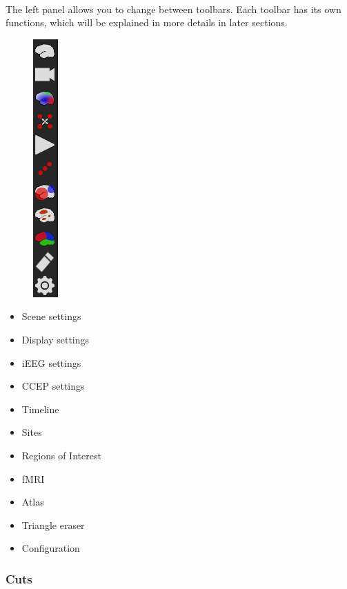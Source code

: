 \documentclass[a4paper]{article}
\begin{document}
\paragraph{} The left panel allows you to change between toolbars. Each toolbar has its own functions, which will be explained in more details in later sections.
\newline
\begin{minipage}{0.2\textwidth}
\begin{figure}[H]
\begin{center}
\includegraphics[scale=0.75]{ToolbarSelector.png}
\end{center}
\end{figure}
\end{minipage}
\begin{minipage}{0.5\textwidth}
\begin{itemize}
\item Scene settings
\item Display settings
\item iEEG settings
\item CCEP settings
\item Timeline
\item Sites
\item Regions of Interest
\item fMRI
\item Atlas
\item Triangle eraser
\item Configuration
\end{itemize}
\end{minipage}
\subsubsection{Cuts}\label{cuts}
\end{document}

